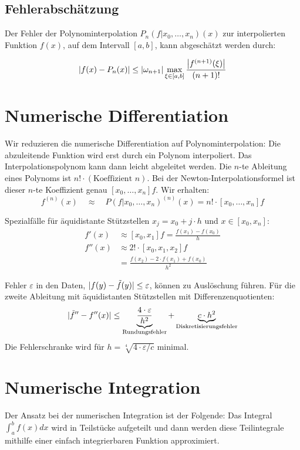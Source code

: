 \documentclass[a4paper,parskip=half*,DIV=15,fontsize=11pt]{scrartcl}
\DeclarePairedDelimiter\abs{\lvert}{\rvert}
\begin{document}
\subsection{Fehlerabschätzung}
Der Fehler der Polynominterpolation $P_n (f|x_0,\ldots,x_n) (x)$ zur interpolierten Funktion $f(x)$, auf dem Intervall $[a,b]$, kann abgeschätzt werden durch:

\[\abs*{f(x) - P_n (x)} \leq \abs*{\omega_{n+1}} \max_{\xi \in [a,b]} \frac{\abs*{f^{(n+1)}(\xi)}}{(n+1)!}\]

\section{Numerische Differentiation}

Wir reduzieren die numerische Differentiation auf Polynominterpolation:
Die abzuleitende Funktion wird erst durch ein Polynom interpoliert.
Das Interpolationspolynom kann dann leicht abgeleitet werden.
Die $n$-te Ableitung eines Polynoms ist $n! \cdot (\text{Koeffizient } n)$.
Bei der Newton-Interpolationsformel ist dieser $n$-te Koeffizient genau $[x_0,\ldots,x_n]f$.
Wir erhalten:
\[ f^{(n)}(x) \quad\approx\quad P(f|x_0, \ldots, x_n)^{(n)} (x) = n! \cdot [x_0,\ldots,x_n]f \]

Spezialfälle für äquidistante Stützstellen $x_j = x_0 + j \cdot h$ und $x \in [x_0, x_n]$:
\begin{align*}
  f'(x) &\approx [x_0,x_1]f = \frac{f(x_1) - f(x_0)}{h} \\
  f''(x) &\approx 2! \cdot [x_0,x_1,x_2]f \\
         &= \frac{f(x_2) - 2 \cdot f(x_1) + f(x_0)}{h^2}
\end{align*}

Fehler $\varepsilon$ in den Daten, $\abs{f(y) - \tilde{f}(y)} \leq \varepsilon$, können zu Auslöschung führen.
Für die zweite Ableitung mit äquidistanten Stützstellen mit Differenzenquotienten:
\[ \abs{\tilde{f}'' - f''(x)} \leq \underbrace{\frac{4 \cdot \varepsilon}{h^2}}_\text{Rundungsfehler} + \underbrace{c \cdot h^2}_\text{Diskretisierungsfehler} \]
Die Fehlerschranke wird für $h = \sqrt[4]{4 \cdot \varepsilon/c}$ minimal.

\section{Numerische Integration}

Der Ansatz bei der numerischen Integration ist der Folgende: Das Integral $\int_a^b f(x) dx$ wird in Teilstücke aufgeteilt und dann werden diese Teilintegrale mithilfe einer einfach integrierbaren Funktion approximiert.
\end{document}
